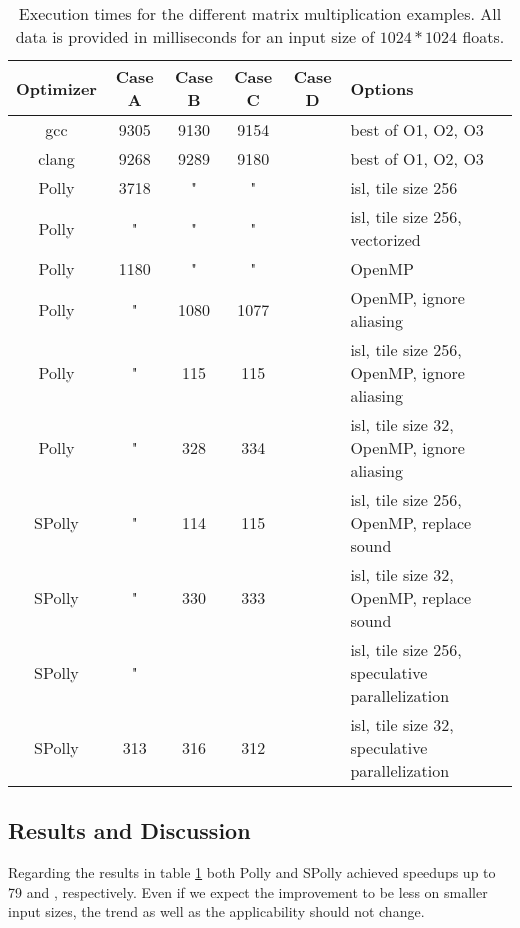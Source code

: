\clearpage

\begin{table}[htpb]
  \caption{Execution times for the different matrix multiplication examples. 
  All data is provided in milliseconds for an input size of $1024 * 1024$ floats.}
  \label{tab:CaseStudyResults}
  \begin{tabularx}{\textwidth}{| c | c | c | c | c | X |}
    \hline
    Optimizer & Case A & Case B & Case C & Case D & Options \\
    \hline
    \hline
    gcc     & 9305 & 9130  & 9154 &     &   best of O1, O2, O3   \\ 
    clang   & 9268 & 9289  & 9180 &     &   best of O1, O2, O3   \\ 
    Polly   & 3718 & "     & "    &     &  isl, tile size 256  \\  
    Polly   &  "   & "     & "    &     &  isl, tile size 256, vectorized  \\  
    Polly   & 1180 & "     & "    &     &  OpenMP  \\  
    Polly   &  "   &  1080 & 1077 &     &  OpenMP, ignore aliasing  \\  
    Polly   &  "   &  115  & 115  &     &  isl, tile size 256, OpenMP, ignore aliasing  \\  
    Polly   &  "   &  328  & 334  &     &  isl, tile size 32,  OpenMP, ignore aliasing  \\  
    SPolly  &  "   &  114  & 115  &     &  isl, tile size 256,  OpenMP, replace sound  \\  
    SPolly  &  "   &  330  & 333  &     &  isl, tile size 32,  OpenMP, replace sound  \\  
    SPolly  &  "   &       &      &     &  isl, tile size 256, speculative parallelization  \\  
    SPolly  &  313 &  316  & 312  &     &  isl, tile size 32, speculative parallelization  \\  
    
    \hline
  \end{tabularx}
\end{table}

\subsection*{Results and Discussion}
Regarding the results in table \ref{tab:CaseStudyResults} both Polly and SPolly 
achieved speedups up to 79 and , respectively. 
Even if we expect the improvement to be less on smaller input sizes, the trend
as well as the applicability should not change.

